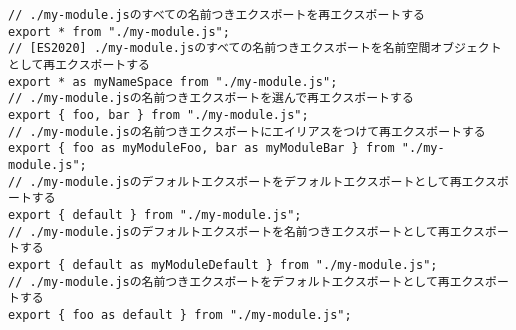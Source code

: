 \begin{lstlisting}
// ./my-module.jsのすべての名前つきエクスポートを再エクスポートする
export * from "./my-module.js";
// [ES2020] ./my-module.jsのすべての名前つきエクスポートを名前空間オブジェクトとして再エクスポートする
export * as myNameSpace from "./my-module.js";
// ./my-module.jsの名前つきエクスポートを選んで再エクスポートする
export { foo, bar } from "./my-module.js";
// ./my-module.jsの名前つきエクスポートにエイリアスをつけて再エクスポートする
export { foo as myModuleFoo, bar as myModuleBar } from "./my-module.js";
// ./my-module.jsのデフォルトエクスポートをデフォルトエクスポートとして再エクスポートする
export { default } from "./my-module.js";
// ./my-module.jsのデフォルトエクスポートを名前つきエクスポートとして再エクスポートする
export { default as myModuleDefault } from "./my-module.js";
// ./my-module.jsの名前つきエクスポートをデフォルトエクスポートとして再エクスポートする
export { foo as default } from "./my-module.js";
\end{lstlisting}
